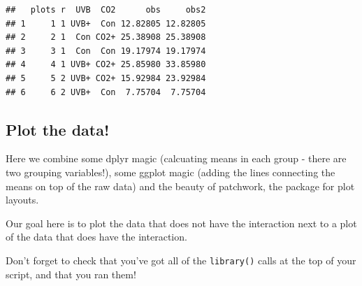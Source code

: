\documentclass[
]{book}
\begin{document}
\begin{verbatim}
##   plots r  UVB  CO2      obs     obs2
## 1     1 1 UVB+  Con 12.82805 12.82805
## 2     2 1  Con CO2+ 25.38908 25.38908
## 3     3 1  Con  Con 19.17974 19.17974
## 4     4 1 UVB+ CO2+ 25.85980 33.85980
## 5     5 2 UVB+ CO2+ 15.92984 23.92984
## 6     6 2 UVB+  Con  7.75704  7.75704
\end{verbatim}

\hypertarget{plot-the-data}{%
\subsection{Plot the data!}\label{plot-the-data}}

Here we combine some dplyr magic (calcuating means in each group - there are two grouping variables!), some ggplot magic (adding the lines connecting the means on top of the raw data) and the beauty of patchwork, the package for plot layouts.

Our goal here is to plot the data that does not have the interaction next to a plot of the data that does have the interaction.

Don't forget to check that you've got all of the \texttt{library()} calls at the top of your script, and that you ran them!
\end{document}
